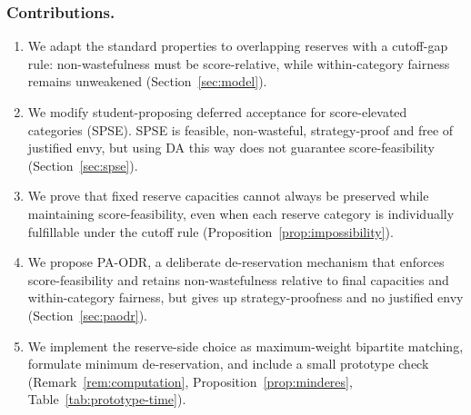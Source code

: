 \documentclass[a4paper,twoside]{article}
\theoremstyle{definition}
\begin{document}
\subsubsection{Contributions.}


\begin{enumerate}
\item We adapt the standard properties to overlapping reserves with a cutoff-gap rule: non-wastefulness must be score-relative, while within-category fairness remains unweakened (Section~\ref{sec:model}).
\item We modify student-proposing deferred acceptance for score-elevated categories (SPSE). SPSE is feasible, non-wasteful, strategy-proof and free of justified envy, but using DA this way does not guarantee score-feasibility (Section~\ref{sec:spse}).
\item We prove that fixed reserve capacities cannot always be preserved while maintaining score-feasibility, even when each reserve category is individually fulfillable under the cutoff rule (Proposition~\ref{prop:impossibility}).
\item We propose PA-ODR, a deliberate de-reservation mechanism that enforces score-feasibility and retains non-wastefulness relative to final capacities and within-category fairness, but gives up strategy-proofness and no justified envy (Section~\ref{sec:paodr}).
\item We implement the reserve-side choice as maximum-weight bipartite matching, formulate minimum de-reservation, and include a small prototype check (Remark~\ref{rem:computation}, Proposition~\ref{prop:minderes}, Table~\ref{tab:prototype-time}).
\end{enumerate}
\end{document}
